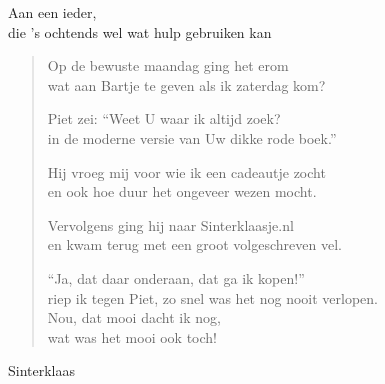 \documentclass[12pt]{brief}
\date{4 december 2004}
\begin{document}
\begin{letter}{Aan een ieder,\\
die 's ochtends wel wat hulp gebruiken kan}

\opening{}


\begin{verse}

Op de bewuste maandag ging het erom\\
wat aan Bartje te geven als ik zaterdag kom?

Piet zei: ``Weet U waar ik altijd zoek?\\
in de moderne versie van Uw dikke rode boek.''

Hij vroeg mij voor wie ik een cadeautje zocht\\
en ook hoe duur het ongeveer wezen mocht.

Vervolgens ging hij naar Sinterklaasje.nl\\
en kwam terug met een groot volgeschreven vel.

``Ja, dat daar onderaan, dat ga ik kopen!''\\
riep ik tegen Piet, zo snel was het nog nooit verlopen.\\[1em]


Nou, dat mooi dacht ik nog,\\
wat was het mooi ook toch!

\end{verse}


Sinterklaas


\closing{}

\end{letter}
\end{document}
